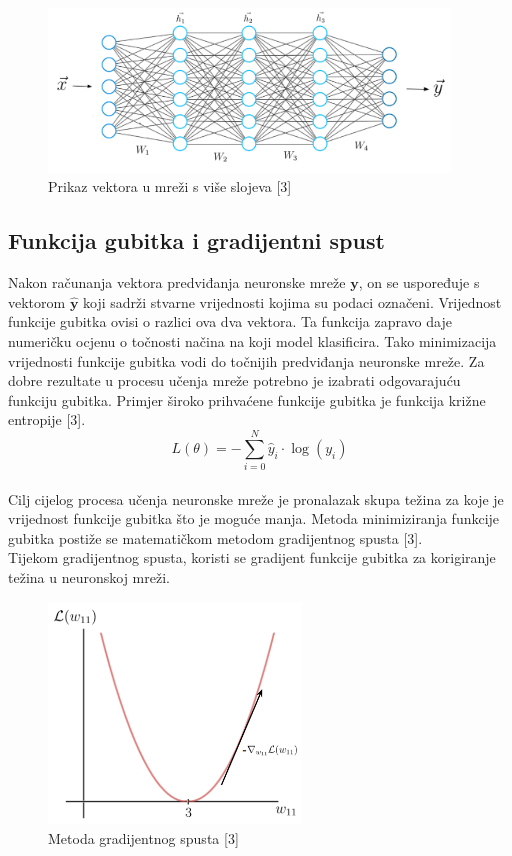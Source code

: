 \documentclass[times, utf8, zavrsni]{fer}
\begin{document}
%
\begin{figure}[!h]
\centering
\includegraphics[width=0.95\textwidth]{./slike/deep-net}
\caption{Prikaz vektora u mreži s više slojeva [3]}
\label{fig:dubokamreza}
\end{figure}
%

\subsection*{Funkcija gubitka i gradijentni spust}
\indent{}
Nakon računanja vektora predviđanja neuronske mreže $\mathbf{y}$, on se uspoređuje s vektorom $\mathbf{\hat{y}}$ koji sadrži stvarne vrijednosti kojima su podaci označeni. Vrijednost funkcije gubitka  ovisi o razlici ova dva vektora. Ta funkcija zapravo daje numeričku ocjenu o točnosti načina na koji model klasificira. Tako minimizacija vrijednosti funkcije gubitka vodi do točnijih predviđanja neuronske mreže. Za dobre rezultate u procesu učenja mreže potrebno je izabrati odgovarajuću funkciju gubitka. Primjer široko prihvaćene funkcije gubitka je funkcija križne entropije  [3].\\
\begin{equation}
L(\theta) = - \sum_{i=0}^{N} \hat{y}_{i} \cdot \log(y_{i})
\end{equation}
\\
Cilj cijelog procesa učenja neuronske mreže je pronalazak skupa težina za koje je vrijednost funkcije gubitka što je moguće manja. Metoda minimiziranja funkcije gubitka postiže se matematičkom metodom gradijentnog spusta [3].\\
\indent{}
Tijekom gradijentnog spusta, koristi se gradijent funkcije gubitka za korigiranje težina u neuronskoj mreži. 
%
\begin{figure}[!h]
\centering
\includegraphics[width=0.6\textwidth]{./slike/gradient}
\caption{Metoda gradijentnog spusta [3]}
\label{fig:gradijent-spust}
\end{figure}
\end{document}
